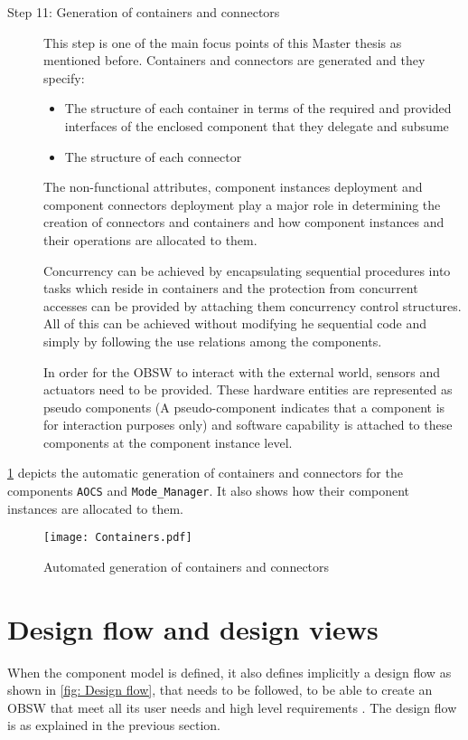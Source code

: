\begin{description}
\item [Step 11: Generation of containers and connectors]  This step is one of the main focus points of this Master thesis as mentioned before. Containers and connectors are generated and they specify:
\begin{itemize}
\item The structure of each container in terms of the required and provided interfaces of the enclosed component that they delegate and subsume
\item The structure of each connector 
\end{itemize} 
The non-functional attributes, component instances deployment and component connectors deployment play a major role in determining the creation of connectors and containers and how component instances and their operations are allocated to them.

Concurrency can be achieved by encapsulating sequential procedures into tasks which reside in containers and the protection from concurrent accesses can be provided by attaching them concurrency control structures. All of this can be achieved without modifying he sequential code and simply by following the use relations among the components.

In order for the OBSW to interact with the external world, sensors and actuators need to be provided. These hardware entities are represented as pseudo components (A pseudo-component indicates that a component is for interaction purposes only) and software capability is attached to these components at the component instance level.    
\end{description}

\cref{fig: Containers} depicts the automatic generation of containers and connectors for the components \texttt{AOCS} and \texttt{Mode\_Manager}. It also shows how their component instances are allocated to them. 

\begin{figure}[h]
	\centering
	\texttt{[image: Containers.pdf]}
	\caption{Automated generation of containers and connectors}
	\label{fig: Containers}
\end{figure}

\section{Design flow and design views}
\label{section: Design flow and views}
When the component model is defined, it also defines implicitly a design flow as shown in \cref{fig: Design flow}, that needs to be followed, to be able to create an OBSW that meet all its user needs and high level requirements \cite{SAVOIR, PhdThesis, CompBasedProcess}. The design flow is as explained in the previous section. 

